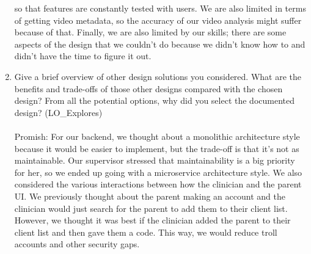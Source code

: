 \documentclass[12pt, titlepage]{article}
\begin{document}
\begin{enumerate}
  so that features are constantly tested with users. We are also limited in terms of getting video metadata, so the accuracy of our video analysis might suffer because of that.
  Finally, we are also limited by our skills; there are some aspects of the design that we couldn't do because we didn't know how to and didn't have the time to figure it out.
  \item Give a brief overview of other design solutions you considered. What
  are the benefits and trade-offs of those other designs compared with the chosen
  design? From all the potential options, why did you select the documented design?
  (LO\_Explores) \\
  \\Promish: For our backend, we thought about a monolithic architecture style because it would be easier to implement, but the trade-off is that it's not as maintainable.
  Our supervisor stressed that maintainability is a big priority for her, so we ended up going with a microservice architecture style. We also considered the various interactions between how
  the clinician and the parent UI. We previously thought about the parent making an account and the clinician would just search for the parent to add them to their client list. However,
  we thought it was best if the clinician added the parent to their client list and then gave them a code. This way, we would reduce troll accounts and other security gaps.
\end{enumerate}
\end{document}
